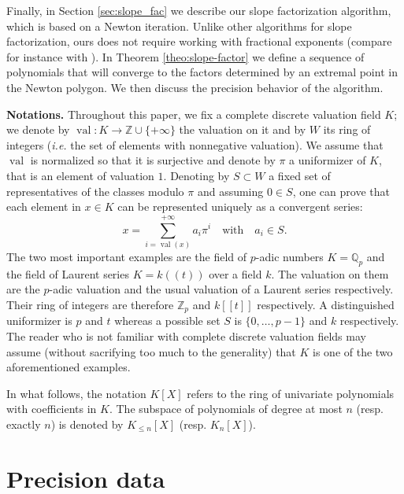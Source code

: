 \documentclass{sig-alternate-05-2015}
\DeclareMathOperator{\val}{val}
\newcommand{\Z}{\mathbb Z}
\newcommand{\Zp}{\Z_p}
\newcommand{\Q}{\mathbb Q}
\newcommand{\Qp}{\Q_p}
\begin{document}
Finally, in Section \ref{sec:slope_fac} we describe
our slope factorization algorithm, which is based on
a Newton iteration.  Unlike other algorithms for
slope factorization, ours does not require working
with fractional exponents (compare for instance with
\cite[\S~6]{poteaux-rybowicz}).
In Theorem \ref{theo:slope-factor} we define a sequence
of polynomials that will converge to the factors
determined by an extremal point in the Newton
polygon.  We then discuss the precision behavior
of the algorithm.

\medskip

\noindent
{\bf Notations.}
Throughout this paper, we fix a complete discrete valuation field $K$; 
we denote by $\val : K \to \Z \cup \{+\infty\}$ the valuation on it and 
by $W$ its ring of integers (\emph{i.e.} the set of elements with 
nonnegative valuation). We assume that $\val$ is normalized so that it
is surjective and denote by $\pi$ a uniformizer of $K$, that is an 
element of valuation $1$. Denoting by $S \subset W$ a fixed set of 
representatives of the classes modulo $\pi$ and assuming $0 \in S$, 
one can prove that each element in $x \in K$ can be represented 
uniquely as a convergent series:
\begin{equation}
\label{eq:CDVFseries}
x = \sum_{i=\val(x)}^{+\infty} a_i \pi^i
\quad \text{with} \quad a_i \in S.
\end{equation}
The two most important examples are the field of $p$-adic numbers $K = 
\Qp$ and the field of Laurent series $K = k((t))$ over a field $k$. The 
valuation on them are the $p$-adic valuation and the usual valuation of 
a Laurent series respectively. Their ring of integers are therefore 
$\Zp$ and $k[[t]]$ respectively. A distinguished uniformizer is $p$ 
and $t$ whereas a possible set $S$ is $\{0, \ldots, p-1\}$ and $k$
respectively.
The reader who is not familiar with complete discrete valuation fields
may assume (without sacrifying too much to the generality) that $K$ is
one of the two aforementioned examples.

In what follows, the notation $K[X]$ refers to the ring of univariate 
polynomials with coefficients in $K$. The subspace of polynomials of 
degree at most $n$ (resp. exactly $n$) is denoted by $K_{\leq n}[X]$ 
(resp. $K_n[X]$).

\section{Precision data} \label{sec:prec_data}
\end{document}
